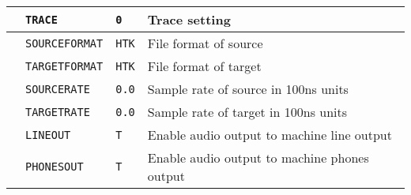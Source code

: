 \begin{center}






\tabletail{\hline}


\begin{supertabular}{|p{1.8cm}|l|l|p{6.6cm}|}







  & \texttt{TRACE} & \texttt{0} & Trace setting\\ \hline







 & \texttt{SOURCEFORMAT} & \texttt{HTK}


  & File format of source \\ 


 & \texttt{TARGETFORMAT} & \texttt{HTK} & File format of target \\ \hline







    


  & \texttt{SOURCERATE} & \texttt{0.0} & Sample rate of source in 100ns units \\ \hline







  


  & \texttt{TARGETRATE} & \texttt{0.0} & Sample rate of target in 100ns units \\ \hline







  & \texttt{LINEOUT} & \texttt{T}   & Enable audio output to machine line output \\ 


  & \texttt{PHONESOUT} & \texttt{T} & Enable audio output to machine phones output \\ 



\end{supertabular}
\end{center}
